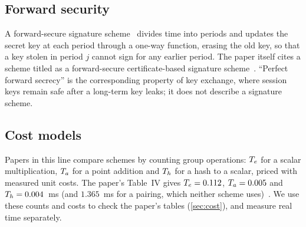 \subsection{Forward security}
A forward-secure signature scheme~\cite{bellare1999} divides time into periods and updates the secret key
at each period through a one-way function, erasing the old key, so that a key stolen in period $j$
cannot sign for any earlier period. The paper itself cites a scheme titled as a forward-secure certificate-based signature
scheme~\cite{li2015}. ``Perfect forward secrecy'' is the corresponding property of key exchange, where
session keys remain safe after a long-term key leaks; it does not describe a signature scheme.

\subsection{Cost models}
Papers in this line compare schemes by counting group operations: $T_{e}$ for a scalar multiplication,
$T_{a}$ for a point addition and $T_{h}$ for a hash to a scalar, priced with measured unit costs. The paper's
Table~IV gives $T_{e}=0.112$, $T_{a}=0.005$ and $T_{h}=0.004$~ms (and $1.365$~ms for a pairing, which neither
scheme uses)~\cite{qiao2023}. We use these counts and costs to check the paper's tables
(\cref{sec:cost}), and measure real time separately.
